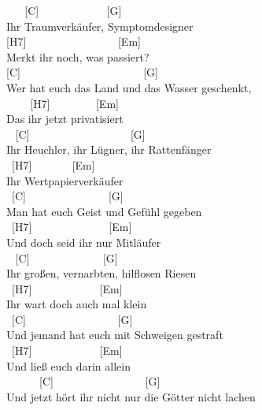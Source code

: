 \documentclass[
  letterpaper,
]{scrbook}
\begin{document}
~ ~ {[}C{]} ~ ~ ~ ~ ~ ~ ~ {[}G{]}\\
Ihr Traumverkäufer, Symptomdesigner\\
{[}H7{]} ~ ~ ~ ~ ~ ~ ~ ~ ~ ~{[}Em{]}\\
Merkt ihr noch, was passiert?\\
{[}C{]} ~ ~ ~ ~ ~ ~ ~ ~ ~ ~ ~ ~ ~ {[}G{]}\\
Wer hat euch das Land und das Wasser geschenkt,\\
\hspace*{0.333em} ~ ~ ~{[}H7{]} ~ ~ ~ ~ ~{[}Em{]}\\
Das ihr jetzt privatisiert\\
\hspace*{0.333em} ~ {[}C{]} ~ ~ ~ ~ ~ ~ ~ ~ ~ ~ ~{[}G{]}\\
Ihr Heuchler, ihr Lügner, ihr Rattenfänger\\
\hspace*{0.333em} ~{[}H7{]} ~ ~ ~ ~ {[}Em{]}\\
Ihr Wertpapierverkäufer\\
\hspace*{0.333em} ~{[}C{]} ~ ~ ~ ~ ~ ~ ~ ~ ~{[}G{]}\\
Man hat euch Geist und Gefühl gegeben\\
\hspace*{0.333em} ~{[}H7{]} ~ ~ ~ ~ ~ ~ ~ ~ {[}Em{]}\\
Und doch seid ihr nur Mitläufer\\
\hspace*{0.333em} ~ {[}C{]} ~ ~ ~ ~ ~ ~ ~ ~{[}G{]}\\
Ihr großen, vernarbten, hilflosen Riesen\\
\hspace*{0.333em} ~{[}H7{]} ~ ~ ~ ~ ~ ~ ~ {[}Em{]}\\
Ihr wart doch auch mal klein\\
\hspace*{0.333em} ~{[}C{]} ~ ~ ~ ~ ~ ~ ~ ~ ~ ~{[}G{]}\\
Und jemand hat euch mit Schweigen gestraft\\
\hspace*{0.333em} ~{[}H7{]} ~ ~ ~ ~ ~ ~ ~ {[}Em{]}\\
Und ließ euch darin allein\\
\hspace*{0.333em} ~ ~ ~ ~{[}C{]} ~ ~ ~ ~ ~ ~ ~ ~ ~ ~{[}G{]}\\
Und jetzt hört ihr nicht nur die Götter nicht lachen\\
\end{document}
